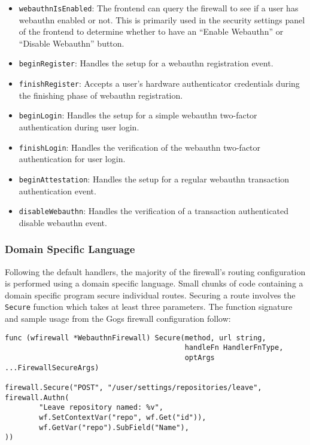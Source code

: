\begin{itemize}[nosep]
\item \lstinline{webauthnIsEnabled}: The frontend can query the firewall to see if a user has webauthn enabled or not. This is primarily used in the security settings panel of the frontend to determine whether to  have an ``Enable Webauthn'' or ``Disable Webauthn'' button.

\item \lstinline{beginRegister}: Handles the setup for a webauthn registration event.

\item \lstinline{finishRegister}: Accepts a user's hardware authenticator credentials during the finishing phase of webauthn registration.

\item \lstinline{beginLogin}: Handles the setup for a simple webauthn two-factor authentication during user login.

\item \lstinline{finishLogin}: Handles the verification of the webauthn two-factor authentication for user login.

\item \lstinline{beginAttestation}: Handles the setup for a regular webauthn transaction authentication event.

\item \lstinline{disableWebauthn}: Handles the verification of a transaction authenticated disable webauthn event.

\end{itemize}

\subsubsection{Domain Specific Language}\label{Sec:DomainSpecificLanguage}

Following the default handlers, the majority of the firewall's routing configuration is performed using a domain specific language. Small chunks of code containing a domain specific program secure individual routes. Securing a route involves the \lstinline{Secure} function which takes at least three parameters. The function signature and sample usage from the Gogs firewall configuration follow:

\begin{lstlisting}
func (wfirewall *WebauthnFirewall) Secure(method, url string, 
                                          handleFn HandlerFnType, 
                                          optArgs ...FirewallSecureArgs)

firewall.Secure("POST", "/user/settings/repositories/leave", firewall.Authn(
        "Leave repository named: %v",
        wf.SetContextVar("repo", wf.Get("id")),
        wf.GetVar("repo").SubField("Name"),
))
\end{lstlisting}

